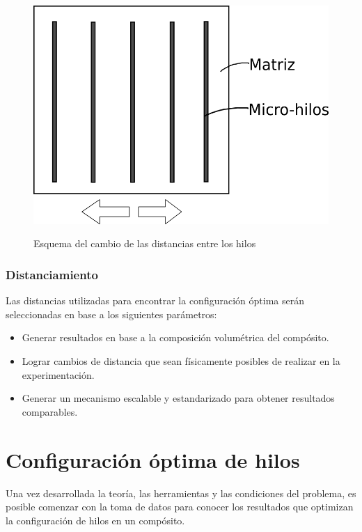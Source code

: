 \documentclass[12pt,letterpaper]{article}
\numberwithin{equation}{section}
\begin{document}
\begin{figure}[H]
	\centering\includegraphics[scale=0.5]{Imagenes/vistas.png}\\
	\caption{Esquema del cambio de las distancias entre los hilos}
	\label{fig:Pantalla vs bloque}
\end{figure}

\subsubsection{Distanciamiento}
Las distancias utilizadas para encontrar la configuración óptima serán seleccionadas en base a los siguientes parámetros:

\begin{itemize}
	\item Generar resultados en base a la composición volumétrica del compósito.
	\item Lograr cambios de distancia que sean físicamente posibles de realizar en la experimentación.
	\item Generar un mecanismo escalable y estandarizado para obtener resultados comparables.
\end{itemize} 
\pagebreak
\section{Configuración óptima de hilos}
Una vez desarrollada la teoría, las herramientas y las condiciones del problema, es posible comenzar con la toma de datos para conocer los resultados que optimizan la configuración de hilos en un compósito.
\end{document}
